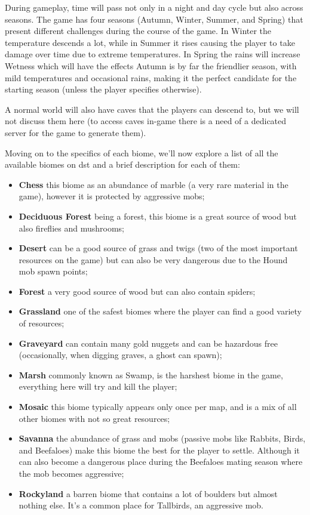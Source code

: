 During gameplay, time will pass not only in a night and day cycle but also across seasons.
The game has four seasons (Autumn, Winter, Summer, and Spring) that present different challenges during the course of the game.
In Winter the temperature descends a lot, while in Summer it rises causing the player to take damage over time due to extreme temperatures.
In Spring the rains will increase Wetness which will have the effects 
Autumn is by far the friendlier season, with mild temperatures and occasional rains, making it the perfect candidate for the starting season (unless the player specifies otherwise).

A normal world will also have caves that the players can descend to, but we will not discuss them here (to access caves in-game there is a need of a dedicated server for the game to generate them).

Moving on to the specifics of each biome, we'll now explore a list of all the available biomes on \gls{dst} and a brief description for each of them:

\begin{itemize}
\item \textbf{Chess} this biome as an abundance of marble (a very rare material in the game), however it is protected by aggressive mobs;
\item \textbf{Deciduous Forest} being a forest, this biome is a great source of wood but also fireflies and mushrooms;
\item \textbf{Desert} can be a good source of grass and twigs (two of the most important resources on the game) but can also be very dangerous due to the Hound mob spawn points;
\item \textbf{Forest} a very good source of wood but can also contain spiders;
\item \textbf{Grassland} one of the safest biomes where the player can find a good variety of resources;
\item \textbf{Graveyard} can contain many gold nuggets and can be hazardous free (occasionally, when digging graves, a ghost can spawn);
\item \textbf{Marsh} commonly known as Swamp, is the harshest biome in the game, everything here will try and kill the player;
\item \textbf{Mosaic} this biome typically appears only once per map, and is a mix of all other biomes with not so great resources;
\item \textbf{Savanna} the abundance of grass and mobs (passive mobs like Rabbits, Birds, and Beefaloes) make this biome the best for the player to settle.
Although it can also become a dangerous place during the Beefaloes mating season where the mob becomes aggressive;
\item \textbf{Rockyland} a barren biome that contains a lot of boulders but almost nothing else. It’s a common place for Tallbirds, an aggressive mob.
\end{itemize}

